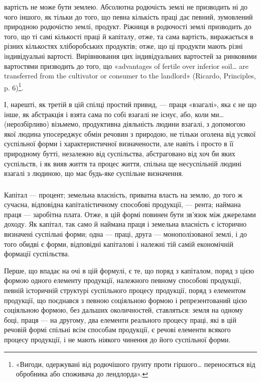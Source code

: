 \parcont{}  %
вартість не може бути землею. Абсолютна родючість землі не призводить ні до
чого іншого, як тільки до того, що певна кількість праці дає певний, зумовлений
природною родючістю землі, продукт. Ріжниця в родючості землі призводить
до того, що ті самі кількості праці й капіталу, отже, та сама вартість, виражається
в різних кількостях хліборобських продуктів; отже, що ці продукти
мають різні індивідуальні вартості. Вирівнювання цих індивідуальних вартостей
за ринковими вартостями призводить до того, що «advantages of fertile over inferior
soil\dots{} are transferred from the cultivator or consumer to the landlord» (Ricardo,
Principles, p. 6)\footnote*{
«Вигоди, одержувані від родючішого ґрунту проти гіршого\dots{} переносяться від обробника або
споживача до лендлорда».
}.

І, нарешті, як третій в цій спілці простий привид, — праця «взагалі»,
яка є не що інше, як абстракція і взята сама по собі взагалі не існує, або,
коли ми\dots{} (нерозбірливо) візьмемо, продуктивна діяльність людини взагалі,
з допомогою якої людина упосереджує обмін речовин з природою, не тільки
оголена від усякої суспільної форми і характеристичної визначености, але навіть
і просто в її природному бутті, незалежно від суспільства, абстраговано від
хоч би яких суспільств, і як вияв життя та процес життя, спільна ще несуспільній
людині взагалі з людиною, що має будь-яке суспільне визначення.

\subsubsection{}

Капітал — процент; земельна власність, приватна власть на землю, до того ж
сучасна, відповідна капіталістичному способові продукції, — рента; наймана праця
— заробітна плата. Отже, в цій формі повинен бути зв’язок між джерелами
доходу. Як капітал, так само й наймана праця і земельна власність є історично
визначені суспільні форми; одна — праці, друга — монополізованої землі, і до
того обидві є форми, відповідні капіталові і належні тій самій економічній
формації суспільства.

Перше, що впадає на очі в цій формулі, є те, що поряд з капіталом,
поряд з цією формою одного елементу продукції, належного певному способові
продукції, певній історичній структурі суспільного процесу продукції, поряд
з елементом продукції, що поєднався з певною соціяльною формою і репрезентований
цією соціяльною формою, без дальших околичностей, ставляться: земля
на одному боці, праця — на другому, два елементи реального процесу праці,
які в цій речовій формі спільні всім способам продукції, є речові елементи
всякого процесу продукції, і не мають ніякого чинення до його суспільної форми.

